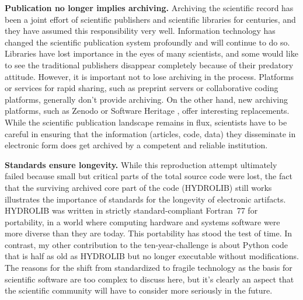 \vspace{2mm}
\textbf{Publication no longer implies archiving.} Archiving the scientific record has been a joint effort of scientific publishers and scientific libraries for centuries, and they have assumed this responsibility very well. Information technology has changed the scientific publication system profoundly and will continue to do so. Libraries have lost importance in the eyes of many scientists, and some would like to see the traditional publishers disappear completely because of their predatory attitude. However, it is important not to lose archiving in the process. Platforms or services for rapid sharing, such as preprint servers or collaborative coding platforms, generally don't provide archiving. On the other hand, new archiving platforms, such as Zenodo \cite{Zenodo} or Software Heritage \cite{AbramaticBuildinguniversalarchive2018}, offer interesting replacements. While the scientific publication landscape remains in flux, scientists have to be careful in ensuring that the information (articles, code, data) they disseminate in electronic form does get archived by a competent and reliable institution.

\vspace{2mm}
\textbf{Standards ensure longevity.} While this reproduction attempt ultimately failed because small but critical parts of the total source code were lost, the fact that the surviving archived core part of the code (HYDROLIB) still works illustrates the importance of standards for the longevity of electronic artifacts. HYDROLIB was written in strictly standard-compliant Fortran~77 for portability, in a world where computing hardware and systems software were more diverse than they are today. This portability has stood the test of time. In contrast, my other contribution to the ten-year-challenge \cite{HinsenRpStructuralflexibility2020} is about Python code that is half as old as HYDROLIB but no longer executable without modifications. The reasons for the shift from standardized to fragile technology as the basis for scientific software are too complex to discuss here, but it's clearly an aspect that the scientific community will have to consider more seriously in the future.
